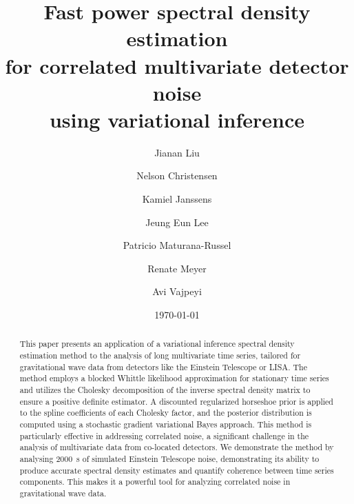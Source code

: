 \documentclass[%
 reprint,
 amsmath,amssymb,
 aps,
 nofootinbib,
]{revtex4-2}
\begin{document}


\title{
Fast power spectral density estimation \\
for correlated multivariate detector noise \\
using variational inference
}%

\author{Jianan Liu}
\author{Nelson Christensen}
\author{Kamiel Janssens}%
\author{Jeung Eun Lee}
\author{Patricio Maturana-Russel}
\author{Renate Meyer}
\author{Avi Vajpeyi}

%

\date{\today}%

\begin{abstract}
 This paper presents an application of a variational inference spectral density estimation method to the analysis of long multivariate time series, tailored for gravitational wave data from detectors like the Einstein Telescope or LISA.
 The method employs a blocked Whittle likelihood approximation for stationary time series and utilizes the Cholesky decomposition of the inverse spectral density matrix to ensure a positive definite estimator. 
 A discounted regularized horseshoe prior is applied to the spline coefficients of each Cholesky factor, and the posterior distribution is computed using a stochastic gradient variational Bayes approach. 
 This method is particularly effective in addressing correlated noise, a significant challenge in the analysis of multivariate data from co-located detectors. 
We demonstrate the method by analysing \SI{2000}{\second} of simulated Einstein Telescope noise, demonstrating its ability to produce accurate spectral density estimates and quantify coherence between time series components. This makes it a powerful tool for analyzing correlated noise in gravitational wave data.
\end{abstract}
\end{document}
